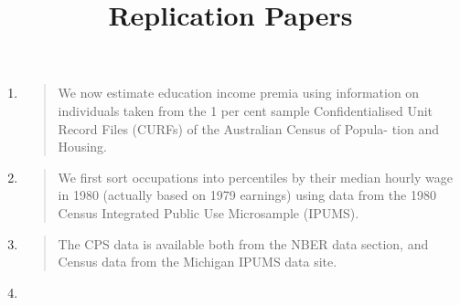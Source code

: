\documentclass{article}
\title{Replication Papers}
\begin{document}
\begin{enumerate}
\item \cite{Coelli2009}
  \begin{quote}
We now estimate education income premia
using information on individuals taken from the 1 per cent sample Confidentialised Unit Record Files (CURFs) of the Australian Census of Popula- tion and Housing. 
  \end{quote}
\item \cite{Autor2006}
  \begin{quote}
    We first sort occupations into percentiles by their median hourly wage in 1980 (actually based on 1979 earnings) using data from the 1980 Census Integrated Public Use Microsample (IPUMS).
  \end{quote}
\item \cite{Bloom2013}
  \begin{quote}
    The CPS data is available both from the NBER data section, and Census data from the Michigan IPUMS data site.
  \end{quote}
\item \cite{Firpo2011}
  \begin{quote}
    
  \end{quote}
\end{enumerate}

\printbibliography
\end{document}

